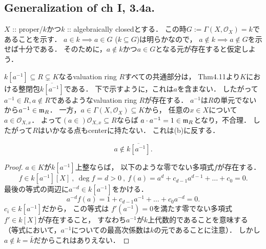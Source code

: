 \documentclass[a4paper]{jsarticle}
\newcommand{\shO}{\mathcal{O}}
\begin{document}
    \subsection{Generalization of ch I, 3.4a.}
    $X$ :: proper/$k$かつ$k$ :: algebraically closedとする．
    この時$G:=\Gamma(X, \shO_X)=k$であることを示す．
    $a \in k \implies a \in G$
    ($k \subseteq G$)は明らかなので，
    $a \not \in k \implies a \not \in G$を示せば十分である．
    そのために，$a \not \in k$かつ$a \in G$となる元が存在すると仮定しよう．

    $k[a^{-1}] \subseteq R \subsetneq K$なるvaluation ring $R$すべての共通部分は，
    Thm4.11より$K$における整閉包$\overline{k[a^{-1}]}$である．
    下で示すように，これは$a$を含まない．
    したがって$a^{-1} \in R, a \not \in R$であるようなvaluation ring $R$が存在する．
    $a^{-1}$は$R$の単元でないから$a^{-1} \in \mathfrak{m}_R$．
    一方，$a \in \Gamma(X, \shO_X) \subseteq K$から，
    任意の$x \in X$について$a \in \shO_{X,x}$．
    よって$(a \in )\shO_{X,x} \subseteq R$ならば
    $a \cdot a^{-1}=1 \in \mathfrak{m}_R$となり，不合理．
    したがって$R$はいかなる点もcenterに持たない．
    これは(b)に反する．

    \begin{Claim}
     \[ a \not \in \overline{k[a^{-1}]}. \] 
    \end{Claim}
    \begin{proof}
        $a \in K$が$k[a^{-1}]$上整ならば，
        以下のような零でない多項式$f$が存在する．
        \[ f \in k[a^{-1}][X] ~,~ \deg f=d>0 ~,~ f(a)=a^d+c_{d-1}a^{d-1}+\dots+c_0=0. \]
        最後の等式の両辺に$a^{-d} \in k[a^{-1}]$をかける．
        \[ a^{-d}f(a)=1+c_{d-1}a^{-1}+\dots+c_0a^{-d}=0. \]
        $c_i \in k[a^{-1}]$だから，
        この等式は
        $f'(a^{-1})=0$を満たす零でない多項式$f' \in k[X]$が存在すること，
        すなわち$a^{-1}$が$k$上代数的であることを意味する
        （等式において，$a^{-1}$についての最高次係数は$k$の元であることに注意）．
        しかし$a \not \in k=\bar{k}$だからこれはありえない．
    \end{proof}

\end{document}
